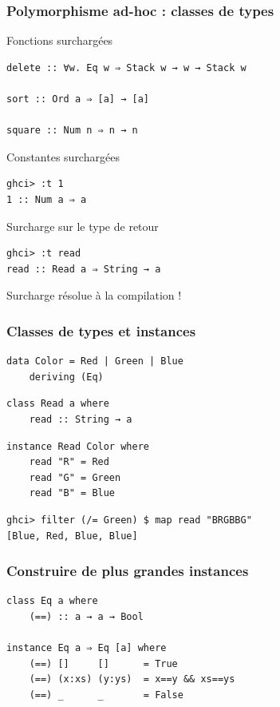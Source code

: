 \documentclass[10pt]{beamer}
\begin{document}
\begin{frame}[fragile]
\frametitle{Polymorphisme ad-hoc : classes de types}
\begin{block}
{Fonctions surchargées}
\begin{verbatim}
delete :: ∀w. Eq w ⇒ Stack w → w → Stack w

sort :: Ord a ⇒ [a] → [a]

square :: Num n ⇒ n → n
\end{verbatim}
\end{block}
\pause
\begin{block}
{Constantes surchargées}
\begin{verbatim}
ghci> :t 1
1 :: Num a ⇒ a
\end{verbatim}
\end{block}
\pause
\begin{block}
{Surcharge sur le type de retour}
\begin{verbatim}
ghci> :t read
read :: Read a ⇒ String → a
\end{verbatim}
\end{block}
\pause
Surcharge résolue à la compilation !
\end{frame}



\begin{frame}[fragile]
\frametitle{Classes de types et instances}
\begin{verbatim}
data Color = Red | Green | Blue
    deriving (Eq)
\end{verbatim}

\begin{verbatim}
class Read a where
    read :: String → a
\end{verbatim}
\pause
\begin{verbatim}
instance Read Color where
    read "R" = Red
    read "G" = Green
    read "B" = Blue
\end{verbatim}
\pause
\begin{verbatim}
ghci> filter (/= Green) $ map read "BRGBBG"
[Blue, Red, Blue, Blue]
\end{verbatim}
\end{frame}



\begin{frame}[fragile]
\frametitle{Construire de plus grandes instances}
\begin{verbatim}
class Eq a where
    (==) :: a → a → Bool

instance Eq a ⇒ Eq [a] where
    (==) []     []      = True
    (==) (x:xs) (y:ys)  = x==y && xs==ys
    (==) _      _       = False
\end{verbatim}
\end{frame}
\end{document}
